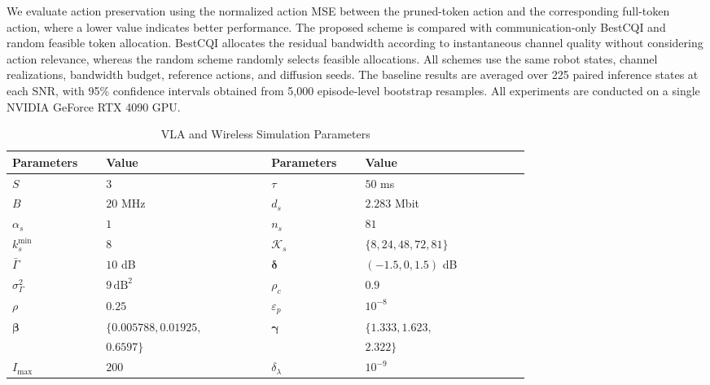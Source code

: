 \documentclass[lettersize,journal]{IEEEtran}
\theoremstyle{custom}
\begin{document}
We evaluate action preservation using the normalized action MSE
between the pruned-token action and the corresponding full-token
action, where a lower value indicates better performance. The proposed scheme is compared with communication-only BestCQI and random feasible token allocation. BestCQI allocates the residual bandwidth according to instantaneous channel quality without considering action relevance,
whereas the random scheme randomly selects feasible allocations. All
schemes use the same robot states, channel realizations, bandwidth
budget, reference actions, and diffusion seeds. The baseline results
are averaged over 225 paired inference states at each SNR, with 95\%
confidence intervals obtained from 5,000 episode-level bootstrap
resamples. All experiments are conducted on a single NVIDIA GeForce RTX 4090 GPU.

\begin{table}[t]
\caption{VLA and Wireless Simulation Parameters}
\label{tab:simulation_parameters}
\centering
\footnotesize
\renewcommand{\arraystretch}{1.12}
\setlength{\tabcolsep}{8pt}

\begin{tabular}{
    p{0.12\linewidth}
    p{0.25\linewidth}
    |
    p{0.12\linewidth}
    p{0.25\linewidth}
}
\toprule
\textbf{Parameters} & \textbf{Value}
& \textbf{Parameters} & \textbf{Value} \\
\midrule

$S$
& $3$
& $\tau$
& $50$ ms \\

$B$
& $20$ MHz
& $d_s$
& $2.283$ Mbit \\

$\alpha_s$
& $1$
& $n_s$
& $81$ \\

$k_s^{\min}$
& $8$
& $\mathcal{K}_s$
& $\{8,24,48,72,81\}$ \\

$\bar{\Gamma}$
& $10$ dB
& $\boldsymbol{\delta}$
& $(-1.5,0,1.5)$ dB \\

$\sigma_{\Gamma}^{2}$
& $9\,\mathrm{dB}^{2}$
& $\rho_c$
& $0.9$ \\

$\rho$
& $0.25$
& $\varepsilon_p$
& $10^{-8}$ \\

$\boldsymbol{\beta}$
& $\{0.005788,0.01925,$
& $\boldsymbol{\gamma}$
& $\{1.333,1.623,$\\ 
& $0.6597\}$
&
& $2.322\}$
 \\

$I_{\max}$
& $200$
& $\delta_{\lambda}$
& $10^{-9}$ \\

\bottomrule
\end{tabular}
\end{table}
\end{document}
